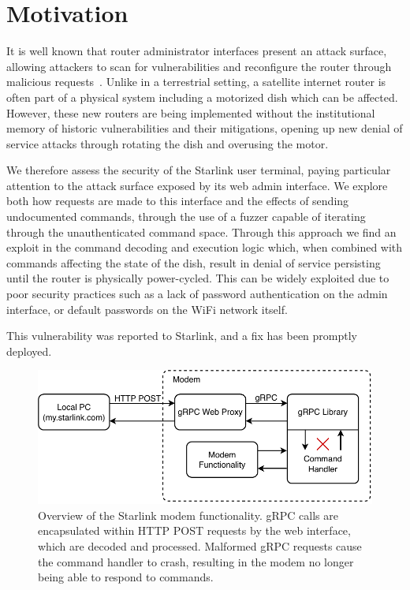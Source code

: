 \section{Motivation}\label{sec:motivation}

It is well known that router administrator interfaces present an attack surface, allowing attackers to scan for vulnerabilities and reconfigure the router through malicious requests~\cite{niemietz2015owning,jeitner2022xdri}.
Unlike in a terrestrial setting, a satellite internet router is often part of a physical system including a motorized dish which can be affected.
However, these new routers are being implemented without the institutional memory of historic vulnerabilities and their mitigations, opening up new denial of service attacks through rotating the dish and overusing the motor.

We therefore assess the security of the Starlink user terminal, paying particular attention to the attack surface exposed by its web admin interface.
We explore both how requests are made to this interface and the effects of sending undocumented commands, through the use of a fuzzer capable of iterating through the unauthenticated command space.
Through this approach we find an exploit in the command decoding and execution logic which, when combined with commands affecting the state of the dish, result in denial of service persisting until the router is physically power-cycled.
This can be widely exploited due to poor security practices such as a lack of password authentication on the admin interface, or default passwords on the WiFi network itself.

This vulnerability was reported to Starlink, and a fix has been promptly deployed.

\begin{figure}
    \centering\includegraphics[width=\columnwidth]{img/modem.pdf}
    \caption{Overview of the Starlink modem functionality. gRPC calls are encapsulated within HTTP POST requests by the web interface, which are decoded and processed. Malformed gRPC requests cause the command handler to crash, resulting in the modem no longer being able to respond to commands.}
    \label{fig:modem}
    \vspace{-1em}
\end{figure}
